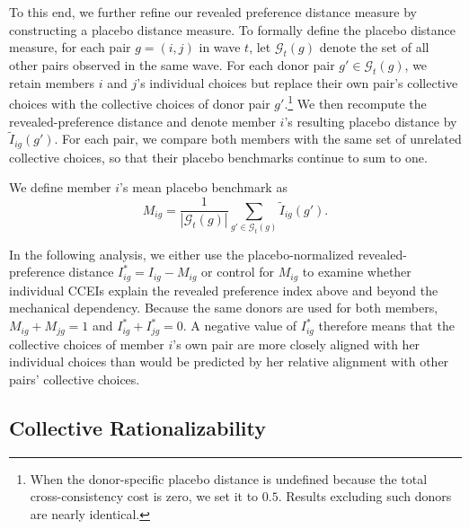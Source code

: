 \documentclass[11 pt]{article}
\begin{document}
To this end, we further refine our revealed preference distance measure by constructing a placebo distance measure. %
To formally define the placebo distance measure, for each pair $g=(i,j)$ in wave $t$, let $\mathcal{G}_t(g)$ denote the set of
all other pairs observed in the same wave. For each donor pair
$g'\in\mathcal{G}_t(g)$, we retain members $i$ and $j$'s individual choices
but replace their own pair's collective choices with the collective choices
of donor pair $g'$.\footnote{When the donor-specific placebo distance is undefined because the total cross-consistency cost is zero, we set it to $0.5$. Results excluding such donors are nearly identical.} We then recompute the revealed-preference distance and
denote member $i$'s resulting placebo distance by
$\widetilde I_{ig}(g')$. For each pair, we compare both members with the same set of unrelated collective choices, so that their placebo benchmarks continue to sum to one.

We define member $i$'s mean placebo benchmark as
\begin{equation}\label{eq:placebo}
M_{ig}
=
\frac{1}{|\mathcal{G}_t(g)|}
\sum_{g'\in\mathcal{G}_t(g)}
\widetilde I_{ig}(g').
\end{equation}

In the following analysis, we either use the placebo-normalized revealed-preference distance $
I^*_{ig}=I_{ig}-M_{ig}$ or control for $M_{ig}$ to examine whether individual CCEIs explain the revealed preference index above and beyond the mechanical dependency.  Because the same donors are used for both members, $M_{ig}+M_{jg}=1$ and $I^*_{ig}+I^*_{jg}=0$. A negative value of $I^*_{ig}$ therefore means that the collective choices of member $i$'s own pair are more closely aligned with her individual choices than would be predicted by her relative alignment with other pairs' collective choices.
 
 


\subsection{Collective Rationalizability}
\label{subsec:collective_rationalizability}
\end{document}
